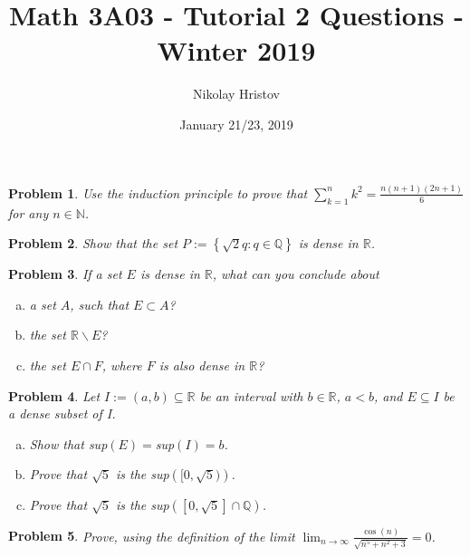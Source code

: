 \documentclass[11pt]{article}
\theoremstyle{plain}
\newtheorem{problem}{Problem}
\theoremstyle{remark}
\newcommand {\mbN} {\mathbb N}
\begin{document}
	\title{Math 3A03 - Tutorial 2 Questions - Winter 2019}
	\author{Nikolay Hristov}
	\date{January 21/23, 2019}
	\maketitle
	
	\begin{problem}
		Use the induction principle to prove that $\displaystyle \sum_{k=1}^n k^2 = \frac{n(n+1)(2n+1)}{6}$ for any $n \in \mbN$.
	\end{problem}

	\begin{problem}
		\label{density_of_set}
		Show that the set $P:=\left\{\sqrt{2}q : q \in \mathbb{Q}\right\}$ is dense in $\mathbb{R}$.
	\end{problem}
	
	\begin{problem}
		If a set $E$ is dense in $\mathbb{R}$, what can you conclude about
		\begin{enumerate}[(a)]
			\item a set $A$, such that $E \subset A$?
			
			\item the set $\mathbb{R} \backslash E$?
			
			\item the set $E \cap F$, where $F$ is also dense in $\mathbb{R}$?
		\end{enumerate}
	\end{problem}

	\begin{problem}
	Let $I := (a,b) \subseteq \mathbb{R}$ be an interval with $b \in \mathbb{R}$, $a<b$, and $E \subseteq I$ be a dense subset of I.
	
	\begin{enumerate}[(a)]
		\item Show that sup$(E)=$sup$(I) = b$. 
		\item Prove that $\sqrt{5}$ is the sup$\left( [0, \sqrt{5}) \right)$.
		\item Prove that $\sqrt{5}$ is 
		the sup$\left( [0, \sqrt{5}] \cap	\mathbb{Q} \right)$.
	\end{enumerate}
	\end{problem}

	\begin{problem}
		Prove, using the definition of the limit $\displaystyle \lim_{n\rightarrow \infty} \frac {\cos(n)}{\sqrt{n^5+n^2+3 }}= 0$.
	\end{problem}
	
\end{document}
